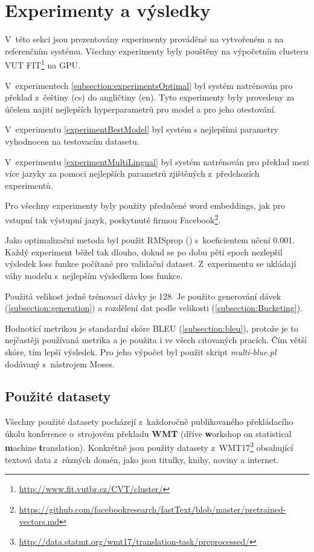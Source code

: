 \chapter{Experimenty a výsledky} \label{chapter:results}
V~této sekci jsou prezentovány experimenty prováděné na vytvořeném a na referenčním systému. Všechny experimenty byly pouštěny na výpočetním clusteru VUT FIT\footnote{\url{http://www.fit.vutbr.cz/CVT/cluster/}} na GPU.

V~experimentech \ref{subsection:experimentsOptimal} byl systém natrénován pro překlad z~češtiny (cs) do angličtiny (en). Tyto experimenty byly provedeny za účelem najití nejlepších hyperparametrů pro model a pro jeho otestování.

V~experimentu \ref{experimentBestModel} byl systém s nejlepšími parametry vyhodnocen na testovacím datasetu.

V~experimentu \ref{experimentMultiLingual} byl systém natrénován pro překlad mezi více jazyky za pomoci nejlepších parametrů zjištěných z~předchozích experimentů.

Pro všechny experimenty byly použity předučené word embeddings, jak pro vstupní tak výstupní jazyk, poskytnuté firmou Facebook\footnote{\url{https://github.com/facebookresearch/fastText/blob/master/pretrained-vectors.md}}.

Jako optimalizační metoda byl použit RMSprop (\cite{gradientDescent}) s~koeficientem učení 0.001. Každý experiment běžel tak dlouho, dokud se po dobu pěti epoch nezlepšil výsledek loss funkce počítané pro validační dataset. Z~experimentu se ukládají váhy modelu s~nejlepším výsledkem loss funkce.

Použitá velikost jedné trénovací dávky je 128. Je použito generování dávek (\ref{subsection:generation}) a rozdělení dat podle velikosti (\ref{subsection:Bucketing}).

Hodnotící metrikou je standardní skóre BLEU (\ref{subsection:bleu}), protože je to nejčastěji používaná metrika a je použita i ve všech citovaných pracích. Čím větší skóre, tím lepší výsledek. Pro jeho výpočet byl použit skript \emph{multi-blue.pl} dodávaný s~nástrojem Moses.


\section{Použité datasety}
Všechny použité datasety pocházejí z~každoročně publikovaného překládacího úkolu konference o~strojovém překladu \textbf{WMT} (dříve \textbf{w}orkshop on statistical \textbf{m}achine \textbf{t}ranslation). Konkrétně jsou použity datasety z~WMT17\footnote{\url{http://data.statmt.org/wmt17/translation-task/preprocessed/}} obsahující textová data z~různých domén, jako jsou titulky, knihy, noviny a internet.

